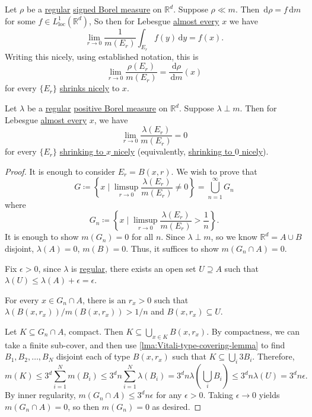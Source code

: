 \begin{corollary}
	Let \(\rho\) be a \hyperref[def:regular]{regular} \hyperref[def:signed-measure]{signed Borel measure} on \(\mathbb{R}^d\). Suppose \(\rho \ll m\). Then
	\(\,\mathrm{d}\rho = f\,\mathrm{d}m\) for some \(f \in L^1_{\mathrm{loc}}(\mathbb{R}^d)\), So then for Lebesgue \hyperref[def:mu-almost-everywhere]{almost every} \(x\)
	we have
	\[
		\lim_{r \to 0} \frac{1}{m(E_r)} \int_{E_r} f(y) \,\mathrm{d}y = f(x).
	\]
	Writing this nicely, using established notation, this is
	\[
		\lim_{r \to 0} \frac{\rho(E_r)}{m(E_r)} = \frac{\,\mathrm{d}\rho}{\,\mathrm{d}m}(x)
	\]
	for every \(\{E_r\}\) \hyperref[def:shrink-nicely]{shrinks nicely} to \(x\).
\end{corollary}

\begin{proposition}\label{prop:lec-32}
	Let \(\lambda\) be a \hyperref[def:regular]{regular} \hyperref[def:signed-measure]{positive Borel measure} on \(\mathbb{R}^d\). Suppose \(\lambda \perp m\).
	Then for Lebesgue \hyperref[def:mu-almost-everywhere]{almost every} \(x\), we have
	\[
		\lim_{r \to 0} \frac{\lambda(E_r)}{m(E_r)} = 0
	\]
	for every \(\{E_r\}\) \hyperref[def:shrink-nicely]{shrinking to \(x\) nicely} (equivalently, \hyperref[def:shrink-nicely]{shrinking to \(0\) nicely}).
\end{proposition}

\begin{proof}
	It is enough to consider \(E_r = B(x,r)\). We wish to prove that
	\[
		G \coloneqq \left\{x \mid \limsup_{r \to 0} \frac{\lambda(E_r)}{m(E_r)} \neq 0\right\}  = \bigcup_{n = 1}^\infty G_n
	\]
	where
	\[
		G_n \coloneqq \left\{x \mid \limsup_{r \to 0} \frac{\lambda(E_r)}{m(E_r)} > \frac{1}{n}\right\}.
	\]
	It is enough to show \(m(G_n) = 0\) for all \(n\). Since \(\lambda \perp m\), so we know \(\mathbb{R}^d = A \cup B\) disjoint,
	\(\lambda(A) = 0\), \(m(B) = 0\). Thus, it suffices to show \(m(G_n \cap A) = 0\).

	Fix \(\epsilon> 0\), since \(\lambda\) is \hyperref[def:regular]{regular}, there exists an open set \(U \supseteq A\) such that \(\lambda(U) \leq \lambda(A) + \epsilon= \epsilon \).

	For every \(x \in G_n \cap A\), there is an \(r_x > 0\) such that \(\lambda(B(x,r_x))/m(B(x,r_x)) > 1/n\) and \(B(x,r_x) \subseteq U\).

	Let \(K \subseteq G_n \cap A\), compact. Then \(K \subseteq \bigcup_{x \in K} B(x,r_x)\). By compactness, we can take a finite sub-cover, and then use
	\autoref{lma:Vitali-type-covering-lemma} to find \(B_1,B_2,\ldots,B_N\) disjoint each of type \(B(x,r_x)\) such that \(K \subseteq \bigcup_i 3B_i\).
	Therefore,
	\[
		m(K) \leq 3^d \sum_{i=1}^N m(B_i) \leq 3^dn\sum_{i=1}^N \lambda(B_i) = 3^d n\lambda\left( \bigcup_i B_i \right) \leq 3^dn\lambda(U) = 3^dn \epsilon .
	\]
	By inner regularity, \(m(G_n \cap A) \leq 3^d n\epsilon\) for any \(\epsilon> 0\). Taking \(\epsilon\to 0\) yields \(m(G_n \cap A) = 0\), so then \(m(G_n) = 0\) as desired.
\end{proof}

